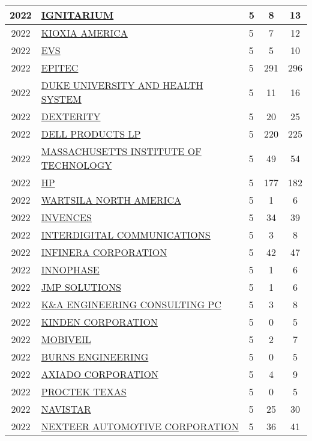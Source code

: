 \documentclass{article}%
\begin{document}
\begin{longtable}{c|p{20em}|p{5em}|c|c}
\hline%
2022&\hyperref[subsec:IGNITARIUM]{IGNITARIUM}&5&8&13\\%
\hline%
2022&\hyperref[subsec:KIOXIAAMERICA]{KIOXIA AMERICA}&5&7&12\\%
\hline%
2022&\hyperref[subsec:EVS]{EVS}&5&5&10\\%
\hline%
2022&\hyperref[subsec:EPITEC]{EPITEC}&5&291&296\\%
\hline%
2022&\hyperref[subsec:DUKEUNIVERSITYANDHEALTHSYSTEM]{DUKE UNIVERSITY AND HEALTH SYSTEM}&5&11&16\\%
\hline%
2022&\hyperref[subsec:DEXTERITY]{DEXTERITY}&5&20&25\\%
\hline%
2022&\hyperref[subsec:DELLPRODUCTSLP]{DELL PRODUCTS LP}&5&220&225\\%
\hline%
2022&\hyperref[subsec:MASSACHUSETTSINSTITUTEOFTECHNOLOGY]{MASSACHUSETTS INSTITUTE OF TECHNOLOGY}&5&49&54\\%
\hline%
2022&\hyperref[subsec:HP]{HP}&5&177&182\\%
\hline%
2022&\hyperref[subsec:WARTSILANORTHAMERICA]{WARTSILA NORTH AMERICA}&5&1&6\\%
\hline%
2022&\hyperref[subsec:INVENCES]{INVENCES}&5&34&39\\%
\hline%
2022&\hyperref[subsec:INTERDIGITALCOMMUNICATIONS]{INTERDIGITAL COMMUNICATIONS}&5&3&8\\%
\hline%
2022&\hyperref[subsec:INFINERACORPORATION]{INFINERA CORPORATION}&5&42&47\\%
\hline%
2022&\hyperref[subsec:INNOPHASE]{INNOPHASE}&5&1&6\\%
\hline%
2022&\hyperref[subsec:JMPSOLUTIONS]{JMP SOLUTIONS}&5&1&6\\%
\hline%
2022&\hyperref[subsec:KAENGINEERINGCONSULTINGPC]{K\&A ENGINEERING CONSULTING PC}&5&3&8\\%
\hline%
2022&\hyperref[subsec:KINDENCORPORATION]{KINDEN CORPORATION}&5&0&5\\%
\hline%
2022&\hyperref[subsec:MOBIVEIL]{MOBIVEIL}&5&2&7\\%
\hline%
2022&\hyperref[subsec:BURNSENGINEERING]{BURNS ENGINEERING}&5&0&5\\%
\hline%
2022&\hyperref[subsec:AXIADOCORPORATION]{AXIADO CORPORATION}&5&4&9\\%
\hline%
2022&\hyperref[subsec:PROCTEKTEXAS]{PROCTEK TEXAS}&5&0&5\\%
\hline%
2022&\hyperref[subsec:NAVISTAR]{NAVISTAR}&5&25&30\\%
\hline%
2022&\hyperref[subsec:NEXTEERAUTOMOTIVECORPORATION]{NEXTEER AUTOMOTIVE CORPORATION}&5&36&41\\%

\end{longtable}
\end{document}

